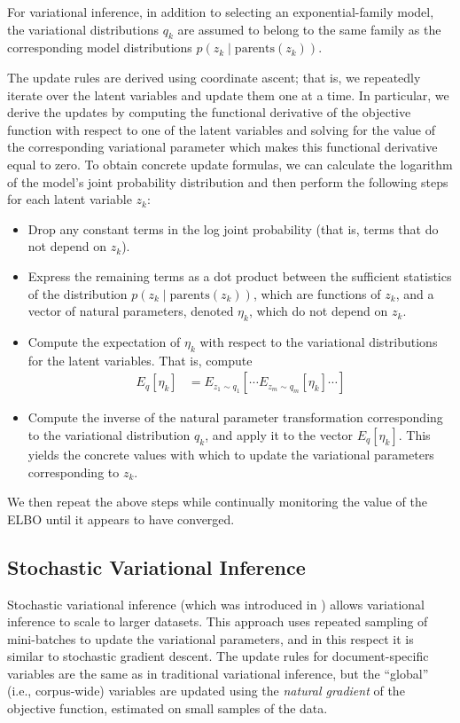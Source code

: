 \documentclass{article}
\begin{document}
For variational inference, in addition to selecting an exponential-family model, the variational distributions $q_k$ are assumed to belong to the same family as the corresponding model distributions $p(z_k \mid \text{parents}(z_k))$.

The update rules are derived using coordinate ascent; that is, we repeatedly iterate over the latent variables and update them one at a time.
In particular, we derive the updates by computing the functional derivative of the objective function with respect to one of the latent variables and solving for the value of the corresponding variational parameter which makes this functional derivative equal to zero.
To obtain concrete update formulas, we can calculate the logarithm of the model's joint probability distribution and then perform the following steps for each latent variable $z_k$:
\begin{itemize}
\item Drop any constant terms in the log joint probability (that is, terms that do not depend on $z_k$).
\item Express the remaining terms as a dot product between the sufficient statistics of the distribution $p(z_k \mid \text{parents}(z_k))$, which are functions of $z_k$, and a vector of natural parameters, denoted $\eta_k$, which do not depend on $z_k$.
\item Compute the expectation of $\eta_k$ with respect to the variational distributions for the latent variables.
That is, compute
\begin{align}
E_q[\eta_k] &= E_{z_1 \sim q_1} \left[ \cdots E_{z_m \sim q_m} \left[ \eta_k \right] \cdots \right]
\end{align}
\item Compute the inverse of the natural parameter transformation corresponding to the variational distribution $q_k$, and apply it to the vector $E_q[\eta_k]$.
This yields the concrete values with which to update the variational parameters corresponding to $z_k$.
\end{itemize}
We then repeat the above steps while continually monitoring the value of the ELBO until it appears to have converged.


\subsection{Stochastic Variational Inference}
\label{sec:svi}

Stochastic variational inference (which was introduced in \cite{hoffman2013stochastic}) allows variational inference to scale to larger datasets.
This approach uses repeated sampling of mini-batches to update the variational parameters, and in this respect it is similar to stochastic gradient descent.
The update rules for document-specific variables are the same as in traditional variational inference, but the ``global'' (i.e., corpus-wide) variables are updated using the \emph{natural gradient} of the objective function, estimated on small samples of the data.
\end{document}
